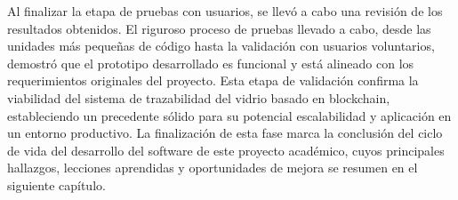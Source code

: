 Al finalizar la etapa de pruebas con usuarios, se llevó a cabo una revisión de los resultados obtenidos. El riguroso proceso de pruebas llevado a cabo, desde las unidades más pequeñas de código hasta la validación con usuarios voluntarios, demostró que el prototipo desarrollado es funcional y está alineado con los requerimientos originales del proyecto. Esta etapa de validación confirma la viabilidad del sistema de trazabilidad del vidrio basado en blockchain, estableciendo un precedente sólido para su potencial escalabilidad y aplicación en un entorno productivo. La finalización de esta fase marca la conclusión del ciclo de vida del desarrollo del software de este proyecto académico, cuyos principales hallazgos, lecciones aprendidas y oportunidades de mejora se resumen en el siguiente capítulo.
